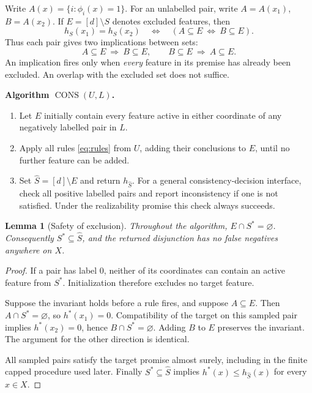 \documentclass[11pt,a4paper]{article}
\newtheorem{lemma}[theorem]{Lemma}
\newcommand{\CONS}{\operatorname{CONS}}
\begin{document}
Write \(A(x)=\{i:\phi_i(x)=1\}\). For an unlabelled pair, write
\(A=A(x_1)\), \(B=A(x_2)\). If \(E=[d]\setminus S\) denotes excluded
features, then
\begin{equation}\label{eq:closed}
 h_S(x_1)=h_S(x_2)
 \quad\Longleftrightarrow\quad
 (A\subseteq E\ \Longleftrightarrow\ B\subseteq E).
\end{equation}
Thus each pair gives two implications between sets:
\begin{equation}\label{eq:rules}
 A\subseteq E\ \Longrightarrow\ B\subseteq E,
 \qquad
 B\subseteq E\ \Longrightarrow\ A\subseteq E.
\end{equation}
An implication fires only when \emph{every} feature in its premise has
already been excluded. An overlap with the excluded set does not suffice.

\medskip
\textbf{Algorithm \(\CONS(U,L)\).}
\begin{enumerate}
\item Let \(E\) initially contain every feature active in either coordinate
of any negatively labelled pair in \(L\).
\item Apply all rules \eqref{eq:rules} from \(U\), adding their conclusions
to \(E\), until no further feature can be added.
\item Set \(\widehat S=[d]\setminus E\) and return \(h_{\widehat S}\).
For a general consistency-decision interface, check all positive labelled
pairs and report inconsistency if one is not satisfied.
Under the realizability promise this check always succeeds.
\end{enumerate}

\begin{lemma}[Safety of exclusion]\label{lem:safety}
Throughout the algorithm, \(E\cap S^*=\varnothing\).
Consequently \(S^*\subseteq\widehat S\), and the returned disjunction has
no false negatives anywhere on \(X\).
\end{lemma}

\begin{proof}
If a pair has label \(0\), neither of its coordinates can contain an active
feature from \(S^*\). Initialization therefore excludes no target feature.

Suppose the invariant holds before a rule fires, and suppose \(A\subseteq E\).
Then \(A\cap S^*=\varnothing\), so \(h^*(x_1)=0\). Compatibility of the
target on this sampled pair implies \(h^*(x_2)=0\), hence
\(B\cap S^*=\varnothing\). Adding \(B\) to \(E\) preserves the invariant.
The argument for the other direction is identical.

All sampled pairs satisfy the target promise almost surely, including in the
finite capped procedure used later. Finally \(S^*\subseteq\widehat S\)
implies \(h^*(x)\le h_{\widehat S}(x)\) for every \(x\in X\).
\end{proof}
\end{document}
